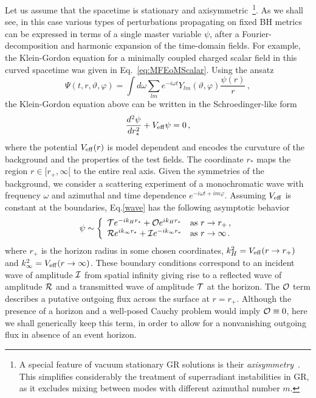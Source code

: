 \documentclass[11pt]{article}
\newcommand{\be}{\begin{equation}}
\newcommand{\ee}{\end{equation}}
\numberwithin{equation}{section} %
\begin{document}
Let us assume that the spacetime is stationary and axisymmetric~\footnote{A special feature of vacuum stationary GR solutions is their \emph{axisymmetry}~\cite{Hawking:1971vc}. This simplifies considerably the treatment of superradiant instabilities in GR, as it excludes mixing between modes with different azimuthal number $m$.}.
%
As we shall see, in this case various types of 
perturbations propagating on fixed BH metrics can be expressed in terms of a single master variable $\psi$, after a 
Fourier-decomposition and harmonic expansion of the time-domain fields. For example,
the Klein-Gordon equation for a minimally coupled charged scalar field in this curved spacetime was given in Eq.~\eqref{eq:MFEoMScalar}. Using the ansatz 
%
\be
\Psi(t,r,\vartheta,\varphi)=\int d\omega \sum_{lm} e^{-i\omega t}Y_{lm}(\vartheta,\varphi) \frac{\psi(r)}{r}\,,\label{eq:Fourier}
\ee
% 
the Klein-Gordon equation above can be written in the Schroedinger-like form
%
\begin{equation}
\frac{d^2 \psi}{dr_*^2}+V_{\rm eff} \psi=0\,,\label{wave} 
\end{equation}
%
where the potential $V_{\rm eff}(r)$ is model dependent and encodes the curvature of the background and the properties of the test fields. The coordinate $r_*$ maps the region $r\in[r_+,\infty[$ to the entire real axis. Given the symmetries of the background, we consider a scattering experiment of a monochromatic wave with frequency $\omega$ and azimuthal and time dependence $e^{-i\omega t+im\varphi}$. Assuming $V_{\rm eff}$ is constant at the boundaries, Eq.\eqref{wave} has the following asymptotic behavior 
%
\begin{equation}
 \psi \sim\left\{
\begin{array}{ll}
{\cal T}e^{-i k_H r_*}+{\cal O}e^{i k_H r_*} & {\rm as}\ r\rightarrow r_+ \,, \\
{\cal R}e^{i k_\infty r_*}+ {\cal I}e^{-i k_\infty r_*}& {\rm as}\ r\rightarrow \infty\,.
\end{array}
\right. \label{bound2}
\end{equation}
%
where $r_+$ is the horizon radius in some chosen coordinates, $k_H^2=V_{\rm eff}(r\to r_+)$ and $k_\infty^2=V_{\rm eff}(r\to \infty)$.
These boundary conditions correspond to an incident wave of amplitude ${\cal I}$ from spatial infinity giving rise to a reflected wave of amplitude ${\cal R}$ and a transmitted wave of amplitude ${\cal T}$ at the horizon. 
The ${\cal O}$ term describes a putative outgoing flux across the surface at $r=r_+$. Although the presence of a horizon and a well-posed Cauchy problem would imply ${\cal O}\equiv0$, here we shall generically keep this term, in order to allow for a nonvanishing outgoing flux in absence of an event horizon.
\end{document}
